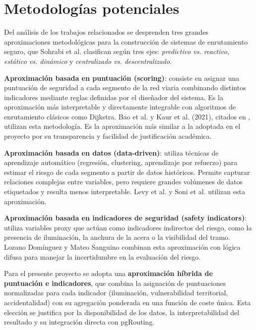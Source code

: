 \section{Metodologías potenciales}
\label{sec:metodologias}

Del análisis de los trabajos relacionados se desprenden tres grandes aproximaciones metodológicas para la construcción de sistemas de enrutamiento seguro, que Sohrabi et al. \cite{sohrabi2022} clasifican según tres ejes: \textit{predictivo vs. reactivo}, \textit{estático vs. dinámico} y \textit{centralizado vs. descentralizado}.

\textbf{Aproximación basada en puntuación (scoring)}: consiste en asignar una puntuación de seguridad a cada segmento de la red viaria combinando distintos indicadores mediante reglas definidas por el diseñador del sistema. Es la aproximación más interpretable y directamente integrable con algoritmos de enrutamiento clásicos como Dijkstra. Bao et al. \cite{bao2017} y Kaur et al. (2021), citados en \cite{sohrabi2022}, utilizan esta metodología. Es la aproximación más similar a la adoptada en el proyecto por su transparencia y facilidad de justificación académica.

\textbf{Aproximación basada en datos (data-driven)}: utiliza técnicas de aprendizaje automático (regresión, clustering, aprendizaje por refuerzo) para estimar el riesgo de cada segmento a partir de datos históricos. Permite capturar relaciones complejas entre variables, pero requiere grandes volúmenes de datos etiquetados y resulta menos interpretable. Levy et al. \cite{levy2020} y Soni et al. \cite{soni2019} utilizan esta aproximación.

\textbf{Aproximación basada en indicadores de seguridad (safety indicators)}: utiliza variables proxy que actúan como indicadores indirectos del riesgo, como la presencia de iluminación, la anchura de la acera o la visibilidad del tramo. Lozano Domínguez y Mateo Sanguino \cite{lozano2021} combinan esta aproximación con lógica difusa para manejar la incertidumbre en la evaluación del riesgo.

Para el presente proyecto se adopta una \textbf{aproximación híbrida de puntuación e indicadores}, que combina la asignación de puntuaciones normalizadas para cada indicador (iluminación, vulnerabilidad territorial, accidentalidad) con su agregación ponderada en una función de coste única. Esta elección se justifica por la disponibilidad de los datos, la interpretabilidad del resultado y su integración directa con pgRouting.

